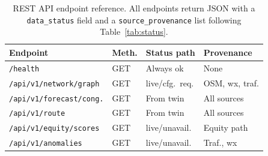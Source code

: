 \begin{table}[t]
\caption{REST API endpoint reference. All endpoints return JSON with a
         \texttt{data\_status} field and a \texttt{source\_provenance}
         list following Table~\ref{tab:status}.}
\label{tab:endpoints}
\centering
\renewcommand{\arraystretch}{1.20}
{\scriptsize
\begin{tabular}{@{}p{3.5cm}lll@{}}
\toprule
\textbf{Endpoint} &
\textbf{Meth.} &
\textbf{Status path} &
\textbf{Provenance} \\
\midrule
\texttt{/health}                   & GET & Always ok       & None \\
\texttt{/api/v1/network/graph}     & GET & live/cfg.\ req. & OSM, wx, traf. \\
\texttt{/api/v1/forecast/cong.}    & GET & From twin       & All sources \\
\texttt{/api/v1/route}             & GET & From twin       & All sources \\
\texttt{/api/v1/equity/scores}     & GET & live/unavail.   & Equity path \\
\texttt{/api/v1/anomalies}         & GET & live/unavail.   & Traf., wx \\
\bottomrule
\end{tabular}
}
\end{table}

